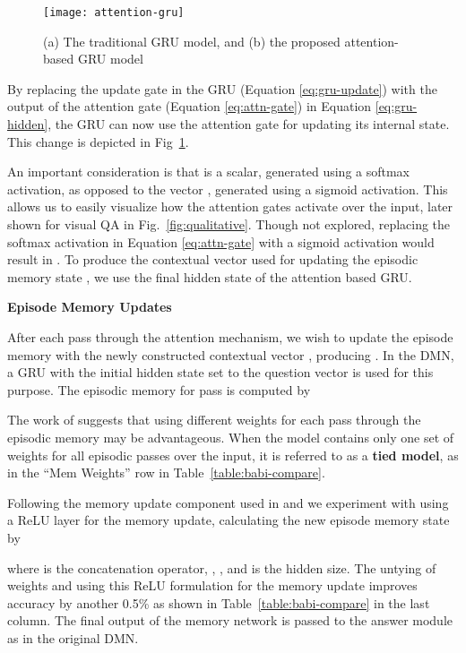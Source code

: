 \documentclass{article}
\begin{document}
\begin{figure}
\centering
\texttt{[image: attention-gru]}
\vspace{-0.3cm}
\caption{(a) The traditional GRU model, and (b) the proposed attention-based GRU model}
\vspace{-0.3cm}
\label{fig:attention}
\end{figure}

By replacing the update gate  in the GRU (Equation \ref{eq:gru-update}) with the output of the attention gate  (Equation \ref{eq:attn-gate}) in Equation \ref{eq:gru-hidden}, the GRU can now use the attention gate for updating its internal state.
This change is depicted in Fig~\ref{fig:attention}.

An important consideration is that  is a scalar, generated using a softmax activation, as opposed to the vector , generated using a sigmoid activation.
This allows us to easily visualize how the attention gates activate over the input, later shown for visual QA in Fig.~\ref{fig:qualitative}.
Though not explored, replacing the softmax activation in Equation \ref{eq:attn-gate} with a sigmoid activation would result in .
To produce the contextual vector  used for updating the episodic memory state , we use the final hidden state of the attention based GRU.

\textbf{Episode Memory Updates}

After each pass through the attention mechanism, we wish to update the episode memory  with the newly constructed contextual vector , producing .
In the DMN, a GRU with the initial hidden state set to the question vector  is used for this purpose.
The episodic memory for pass  is computed by


The work of \citet{Sukhbaatar2015} suggests that using different weights for each pass through the episodic memory may be advantageous.
When the model contains only one set of weights for all episodic passes over the input, it is referred to as a \textbf{tied model}, as in the ``Mem Weights'' row in Table~\ref{table:babi-compare}.



Following the memory update component used in \citet{Sukhbaatar2015} and \citet{Peng2015} we experiment with using a ReLU layer for the memory update, calculating the new episode memory state by

where  is the concatenation operator, , , and  is the hidden size.
The untying of weights and using this ReLU formulation for the memory update improves accuracy by another 0.5\% as shown in Table~\ref{table:babi-compare} in the last column.
The final output of the memory network is passed to the answer module as in the original DMN.
\end{document}
